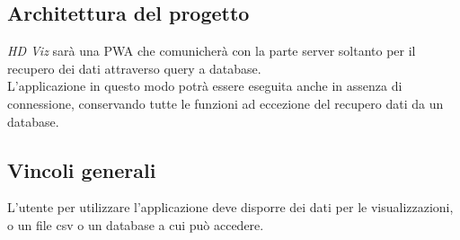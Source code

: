 \subsection{Architettura del progetto}
\emph{HD Viz} sarà una PWA che comunicherà con la parte server soltanto per il recupero dei dati attraverso query a database.
\\
L'applicazione in questo modo potrà essere eseguita anche in assenza di connessione, conservando tutte le funzioni ad eccezione del recupero dati da un database.

\subsection{Vincoli generali}
L'utente per utilizzare l'applicazione deve disporre dei dati per le visualizzazioni, o un file csv o un database a cui può accedere.
